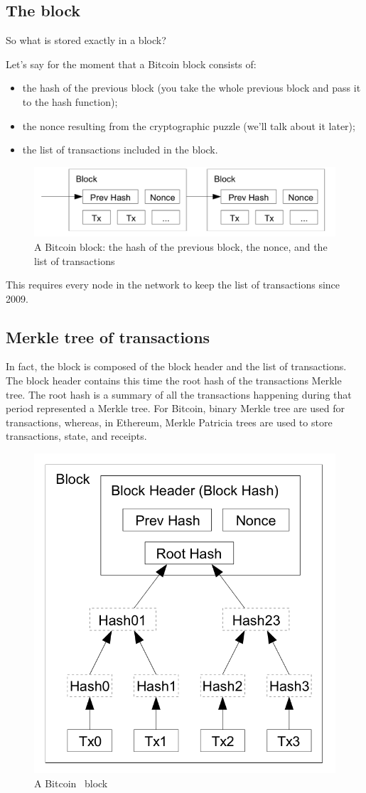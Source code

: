 \subsection{The block}
So what is stored exactly in a block? 

Let's say for the moment that a Bitcoin block consists of:
\begin{itemize}
    \item the hash of the previous block (you take the whole previous block and pass it to the hash function);
    \item the nonce resulting from the cryptographic puzzle (we'll talk about it later); 
    \item the list of transactions included in the block.
\end{itemize}
\begin{figure}[H]
    \centering
\includegraphics[width=0.6\linewidth]{background/block.png}
    \caption{A Bitcoin block: the hash of the previous block, the nonce, and the list of transactions \cite{Nakamoto..09}}
    \label{fig:block}
\end{figure}

This requires every node in the network to keep the list of transactions since 2009.

\subsection{Merkle tree of transactions}
In fact, the block is composed of the block header and the list of transactions. The block header contains this time the root hash of the transactions Merkle tree.
The root hash is a summary of all the transactions happening during that period represented a Merkle tree. For Bitcoin, binary Merkle tree are used for transactions, whereas, in Ethereum, Merkle Patricia trees are used to store transactions, state, and receipts. 
\begin{figure}[H]
    \centering
\includegraphics[width=0.4\linewidth]{background/blockMerkle.png}
    \caption{A Bitcoin~\cite{Nakamoto..09} block}
    \label{fig:blockMerkle}
\end{figure}

